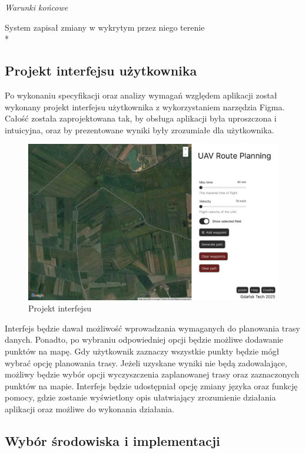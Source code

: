 \vspace{\baselineskip}
\textit{Warunki końcowe}

System zapisał zmiany w wykrytym przez niego terenie \\*

\subsection{Projekt interfejsu użytkownika}

Po wykonaniu specyfikacji oraz analizy wymagań względem aplikacji został wykonany projekt interfejsu użytkownika z wykorzystaniem narzędzia Figma. Całość została zaprojektowana tak, by obsługa aplikacji była uproszczona i intuicyjna, oraz by prezentowane wyniki były zrozumiałe dla użytkownika.

\begin{figure}[H]
    \centering
    \includegraphics[width=15cm]{images/Projekt_interfejsu.png}
    \caption{Projekt interfejsu}
\end{figure}

Interfejs będzie dawał możliwość wprowadzania wymaganych do planowania trasy danych. Ponadto, po wybraniu odpowiedniej opcji będzie możliwe dodawanie punktów na mapę. Gdy użytkownik zaznaczy wszystkie punkty będzie mógł wybrać opcję planowania trasy. Jeżeli uzyskane wyniki nie będą zadowalające, możliwy będzie wybór opcji wyczyszczenia zaplanowanej trasy oraz zaznaczonych punktów na mapie. Interfejs będzie udostępniał opcję zmiany języka oraz funkcję pomocy, gdzie zostanie wyświetlony opis ułatwiający zrozumienie działania aplikacji oraz możliwe do wykonania działania.

\subsection{Wybór środowiska i implementacji}

